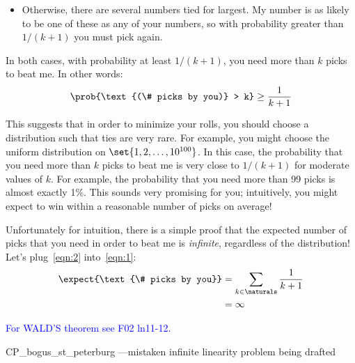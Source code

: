 \begin{editingnotes}
\begin{itemize}
\item Otherwise, there are several numbers tied for largest.  My
number is as likely to be one of these as any of your numbers, so with
probability greater than $1/(k+1)$ you must pick again.

\end{itemize}
%
In both cases, with probability at least $1/(k+1)$, you need more than
$k$ picks to beat me.  In other words:
%
\begin{align}
\prob{\text{(\# picks by you)} > k} \geq \frac{1}{k+1} \label{eqn:2}
\end{align}

This suggests that in order to minimize your rolls, you should choose a
distribution such that ties are very rare.  For example, you might
choose the uniform distribution on $\set{1, 2, \dots, 10^{100}}$.  In
this case, the probability that you need more than $k$ picks to beat
me is very close to $1/(k+1)$ for moderate values of $k$.  For
example, the probability that you need more than 99 picks is almost
exactly 1\%.  This sounds very promising for you; intuitively, you
might expect to win within a reasonable number of picks on average!

Unfortunately for intuition, there is a simple proof that the expected
number of picks that you need in order to beat me is
\emph{infinite}, regardless of the distribution!  Let's
plug~\eqref{eqn:2} into~\eqref{eqn:1}:
%
\begin{align*}
\expect{\text{\# picks by you}}
    & = \sum_{k \in \naturals} \frac{1}{k+1} \\
    & = \infty
\end{align*}

\end{editingnotes}

\begin{editingnotes}
\textcolor{blue}{For WALD'S theorem see F02 ln11-12.}
\end{editingnotes}

\begin{problems}
\practiceproblems
{}

\classproblems
{}

\begin{editingnotes}
CP_bogus_st_peterburg ---mistaken infinite linearity problem being drafted
\end{editingnotes}

\homeworkproblems
{}
\end{problems}

\endinput
